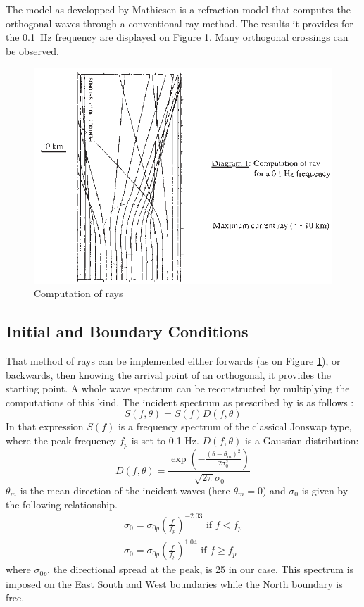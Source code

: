 The model as developped by Mathiesen is a refraction model that computes the
orthogonal waves through a conventional ray method. The results it provides for
the 0.1\ Hz frequency are displayed on Figure \ref{ray}. Many orthogonal
crossings can be observed.
\begin{figure} [!h]
\centering
\includegraphics[scale = 0.5]{diagram.png}
 \caption{Computation of rays}
\label{ray}
\end{figure}

\subsection{Initial and Boundary Conditions}

That method of rays can be implemented  either forwards (as on Figure
\ref{ray}), or backwards, then knowing the arrival point of an orthogonal, it
provides the starting point. A whole wave spectrum can be reconstructed by
multiplying the computations of this kind. The incident spectrum as prescribed
by \cite{Mathiesen1987} is as follows :
$$
S(f,\theta)=S(f)D(f,\theta)
$$
In that expression $S(f)$ is a frequency spectrum of the classical Jonswap type, where the peak frequency $f_p$ is set to 0.1 Hz.
$D(f,\theta)$ is a Gaussian distribution:
$$
D(f,\theta)=\frac{\exp\left(-\frac{(\theta-\theta_m)^2}{2\sigma_0^2} \right)}{\sqrt{2\pi}\sigma_0}
$$
$\theta_m$ is the mean direction of the incident waves (here $\theta_m=0$) and
$\sigma_0$ is given by the following relationship.
$$
\left.
\begin{array}{ll}
\sigma_0= \sigma_{0p}\left(\frac{f}{f_p}\right)^{-2.03}\mbox{ if }f<f_p \\[6pt]
\sigma_0= \sigma_{0p}\left(\frac{f}{f_p}\right)^{1.04}\mbox{ if } f \ge f_p
\end{array}
\right.
$$
where $\sigma_{0p}$, the directional spread at the peak, is 25 in our case.
This spectrum is imposed on the East South and West boundaries while the North boundary is free.

